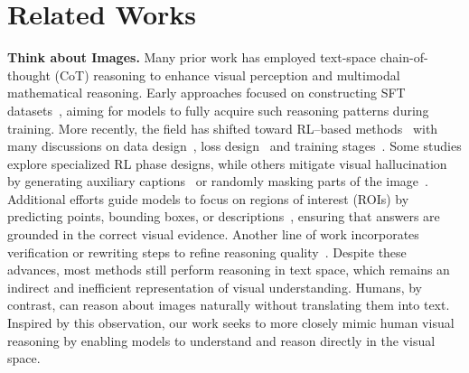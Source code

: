\section{Related Works}








\textbf{Think about Images.} Many prior work has employed text-space chain-of-thought (CoT) reasoning to enhance visual perception and multimodal mathematical reasoning. Early approaches focused on constructing SFT datasets~\citep{xu2024llava,shao2024visual,wei2025perception}, aiming for models to fully acquire such reasoning patterns during training. More recently, the field has shifted toward RL–based methods~\citep{peng2025lmm,tan2025reason,meng2025mm,yang2025r1} with many discussions on data design~\citep{liang2025modomodo}, loss design~\citep{hong2025apo} and training stages~\citep{wei2025advancing,deng2025openvlthinker,liu2025infi,chen2025advancing}. Some studies explore specialized RL phase designs, while others mitigate visual hallucination by generating auxiliary captions~\citep{xia2025visionary} or randomly masking parts of the image~\citep{wang2025perception}. Additional efforts guide models to focus on regions of interest (ROIs) by predicting points, bounding boxes, or descriptions~\citep{jiang2025vlm,ni2025point,yu2025perception,liu2025visual2}, ensuring that answers are grounded in the correct visual evidence. Another line of work incorporates verification or rewriting steps to refine reasoning quality~\citep{wang2025visualprm,shen2025satori,zhang2025r1,chen2025sft}. Despite these advances, most methods still perform reasoning in text space, which remains an indirect and inefficient representation of visual understanding. Humans, by contrast, can reason about images naturally without translating them into text. Inspired by this observation, our work seeks to more closely mimic human visual reasoning by enabling models to understand and reason directly in the visual space.


